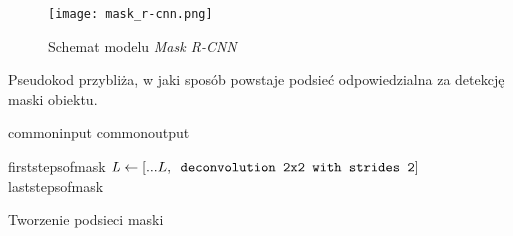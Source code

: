 \begin{figure}[h]
  \centering
  \texttt{[image: mask\_r-cnn.png]}
  \caption{Schemat modelu \textit{Mask R-CNN}}
  \label{fig:mask_r_cnn}
\end{figure}

Pseudokod  przybliża, w jaki sposób powstaje podsieć odpowiedzialna za detekcję maski obiektu.

\begin{algorithm}
  {commoninput}
  {commonoutput}
  \begin{algorithmic}[1]
    {firststepsofmask}
    \State $\mathit{L} \gets [...L,\verb| deconvolution 2x2 with strides 2|]$
    {laststepsofmask}
	\end{algorithmic}
	\caption{Tworzenie podsieci maski}
	\label{alg:mask-r-cnn}
\end{algorithm}
